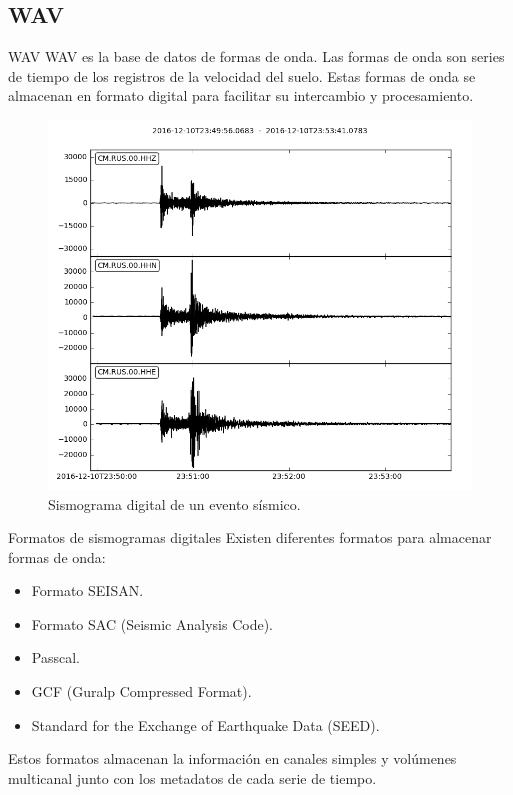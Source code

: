 \documentclass[11pt]{beamer}
\begin{document}
\subsection{WAV}
\begin{frame}{WAV}
WAV es la base de datos de formas de onda. Las formas de onda son series de tiempo de los registros de la velocidad del suelo. Estas formas de onda se almacenan en formato digital para facilitar su intercambio y procesamiento.\\

\begin{figure}
\includegraphics[scale=0.2]{sismo_RUS.png}
\caption{Sismograma digital de un evento sísmico.}
\end{figure}
\end{frame}

\begin{frame}{Formatos de sismogramas digitales}
Existen diferentes formatos para almacenar formas de onda:
\begin{itemize}
\item Formato SEISAN.\\
\pause
\item Formato SAC (Seismic Analysis Code).\\
\pause
\item Passcal.\\
\pause
\item GCF (Guralp Compressed Format).\\
\pause
\item Standard for the Exchange of Earthquake Data (SEED).\\
\pause 
\end{itemize}
Estos formatos almacenan la información en canales simples y volúmenes multicanal junto con los metadatos de cada serie de tiempo. 
\end{frame}
\end{document}
